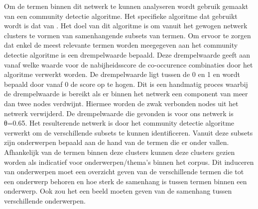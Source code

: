 Om de termen binnen dit netwerk te kunnen analyseren wordt gebruik gemaakt van een community detectie algoritme. Het specifieke algoritme dat gebruikt wordt is dat van \cite{blondel2008fast}. Het doel van dit algoritme is om vanuit het gewogen netwerk clusters te vormen van samenhangende subsets van termen. Om ervoor te zorgen dat enkel de meest relevante termen worden meegegeven aan het community detectie algoritme is een drempelwaarde bepaald. Deze drempelwaarde geeft aan vanaf welke waarde voor de nabijheidsscore de co-occurence combinaties door het algoritme verwerkt worden. De drempelwaarde ligt tussen de 0 en 1 en wordt bepaald door vanaf 0 de score op te hogen. Dit is een handmatig proces waarbij de drempelwaarde is bereikt als er binnen het netwerk een component van meer dan twee nodes verdwijnt. Hiermee worden de zwak verbonden nodes uit het netwerk verwijderd. De drempelwaarde die gevonden is voor ons netwerk is θ=0.65. Het resulterende netwerk is door het community detectie algoritme verwerkt om de verschillende subsets te kunnen identificeren. Vanuit deze subsets zijn onderwerpen bepaald aan de hand van de termen die er onder vallen. Afhankelijk van de termen binnen deze clusters kunnen deze clusters gezien worden als indicatief voor onderwerpen/thema's binnen het corpus. Dit induceren van onderwerpen moet een overzicht geven van de verschillende termen die tot een onderwerp behoren en hoe sterk de samenhang is tussen termen binnen een onderwerp. Ook zou het een beeld moeten geven van de samenhang tussen verschillende onderwerpen. 
